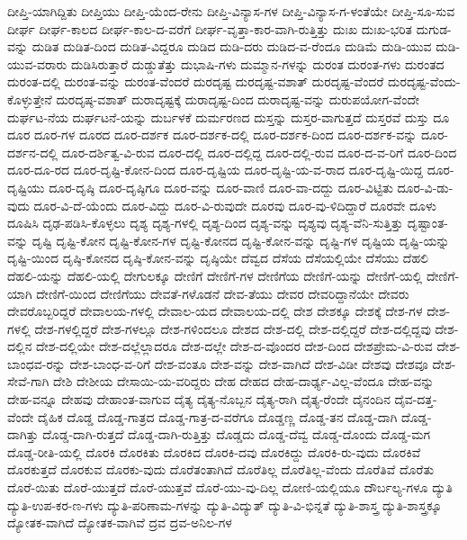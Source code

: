 {ದೀಪ್ತಿ-ಯಾಗಿದ್ದಿತು
ದೀಪ್ತಿಯು
ದೀಪ್ತಿ-ಯೆಂದ-ರೇನು
ದೀಪ್ತಿ-ವಿನ್ಯಾಸ-ಗಳ
ದೀಪ್ತಿ-ವಿನ್ಯಾಸ-ಗ-ಳಂತೆಯೇ
ದೀಪ್ತಿ-ಸೂ-ಸುವ
ದೀರ್ಘ
ದೀರ್ಘ-ಕಾಲದ
ದೀರ್ಘ-ಕಾಲ-ದ-ವರೆಗೆ
ದೀರ್ಘ-ವೃತ್ತಾ-ಕಾರ-ವಾಗಿ-ರುತ್ತಿತ್ತು
ದುಃಖ
ದುಃಖ-ಭರಿತ
ದುಗುಡ-ವನ್ನು
ದುಡಿತ
ದುಡಿತ-ದಿಂದ
ದುಡಿತ-ವಿದ್ದರೂ
ದುಡಿದ
ದುಡಿ-ದರು
ದುಡಿದ-ವ-ರೆಂದೂ
ದುಡಿಮೆ
ದುಡಿ-ಯುವ
ದುಡಿ-ಯುವ-ವರಾರು
ದುಡಿಸಿರುತ್ತಾರೆ
ದುಡ್ಡುತೆತ್ತು
ದುಭಾಷಿ-ಗಳು
ದುಮ್ಮಾನ-ಗಳನ್ನು
ದುರಂತ
ದುರಂತ-ಗಳು
ದುರಂತದ
ದುರಂತ-ದಲ್ಲಿ
ದುರಂತ-ವನ್ನು
ದುರಂತ-ವೆಂದರೆ
ದುರದೃಷ್ಟ
ದುರದೃಷ್ಟ-ವಶಾತ್
ದುರದೃಷ್ಟ-ವೆಂದರೆ
ದುರದೃಷ್ಟ-ವೆಂದು-ಕೊಳ್ಳುತ್ತೇನೆ
ದುರದೃಷ್ಠ-ವಶಾತ್
ದುರಾದೃಷ್ಟಕ್ಕೆ
ದುರಾದೃಷ್ಟ-ದಿಂದ
ದುರಾದೃಷ್ಟ-ವನ್ನು
ದುರುಪಯೋಗ-ವೆಂದೇ
ದುರ್ಘಟ-ನೆಯ
ದುರ್ಘಟನೆ-ಯನ್ನು
ದುರ್ಬಳಕೆ
ದುರ್ಮರಣದ
ದುಸ್ತನ್ನು
ದುಸ್ತರ-ವಾಗುತ್ತದೆ
ದುಸ್ತರವೆ
ದುಸ್ತು
ದೂ
ದೂರ
ದೂರ-ಗಳ
ದೂರದ
ದೂರ-ದರ್ಶಕ
ದೂರ-ದರ್ಶಕ-ದಲ್ಲಿ
ದೂರ-ದರ್ಶಕ-ದಿಂದ
ದೂರ-ದರ್ಶಕ-ವನ್ನು
ದೂರ-ದರ್ಶನ-ದಲ್ಲಿ
ದೂರ-ದರ್ಶಿತ್ವ-ವಿ-ರುವ
ದೂರ-ದಲ್ಲಿ
ದೂರ-ದಲ್ಲಿದ್ದ
ದೂರ-ದಲ್ಲಿ-ರುವ
ದೂರ-ದ-ವ-ರಿಗೆ
ದೂರ-ದಿಂದ
ದೂರ-ದೂ-ರದ
ದೂರ-ದೃಷ್ಟಿ-ಕೋನ-ದಿಂದ
ದೂರ-ದೃಷ್ಟಿಯ
ದೂರ-ದೃಷ್ಟಿ-ಯ-ವ-ರಾದ
ದೂರ-ದೃಷ್ಟಿ-ಯಿದ್ದ
ದೂರ-ದೃಷ್ಟಿಯು
ದೂರ-ದೃಷ್ಠಿ
ದೂರ-ದೃಷ್ಠಿಗೂ
ದೂರ-ವನ್ನು
ದೂರ-ವಾಣಿ
ದೂರ-ವಾ-ದದ್ದು
ದೂರ-ವಿಟ್ಟಿತು
ದೂರ-ವಿ-ಡು-ವುದು
ದೂರ-ವಿ-ದೆ-ಯೆಂದು
ದೂರ-ವಿದ್ದು
ದೂರ-ವಿ-ರುವುದೇ
ದೂರವು
ದೂರ-ವು-ಳಿದಿದ್ದಾರೆ
ದೂರವೇ
ದೂಳು
ದೂಷಿಸಿ
ದೃಢ-ಪಡಿಸಿ-ಕೊಳ್ಳಲು
ದೃಶ್ಯ
ದೃಶ್ಯ-ಗಳಲ್ಲಿ
ದೃಶ್ಯ-ದಿಂದ
ದೃಶ್ಯ-ವನ್ನು
ದೃಶ್ಯವು
ದೃಶ್ಯ-ವೆನಿ-ಸುತ್ತಿತ್ತು
ದೃಷ್ಟಾಂತ-ವನ್ನು
ದೃಷ್ಟಿ
ದೃಷ್ಟಿ-ಕೋನ
ದೃಷ್ಟಿ-ಕೋನ-ಗಳ
ದೃಷ್ಟಿ-ಕೋನದ
ದೃಷ್ಟಿ-ಕೋನ-ವನ್ನು
ದೃಷ್ಟಿ-ಗಳ
ದೃಷ್ಟಿಯ
ದೃಷ್ಟಿ-ಯನ್ನು
ದೃಷ್ಟಿ-ಯಿಂದ
ದೃಷ್ಠಿ-ಕೋನದ
ದೃಷ್ಠಿ-ಕೋನ-ವನ್ನು
ದೃಷ್ಠಿಯೇ
ದೆವ್ವದ
ದೆಸೆಯ
ದೆಸೆಯಲ್ಲಿಯೇ
ದೆಸೆಯು
ದೆಹಲಿ
ದೆಹಲಿ-ಯನ್ನು
ದೆಹಲಿ-ಯಲ್ಲಿ
ದೇಗುಲಕ್ಕೂ
ದೇಣಿಗೆ
ದೇಣಿಗೆ-ಗಳ
ದೇಣಿಗೆಯ
ದೇಣಿಗೆ-ಯನ್ನು
ದೇಣಿಗೆ-ಯಲ್ಲಿ
ದೇಣಿಗೆ-ಯಾಗಿ
ದೇಣಿಗೆ-ಯಿಂದ
ದೇಣಿಗೆಯು
ದೇವತೆ-ಗಳೊಡನೆ
ದೇವ-ತೆಯು
ದೇವರ
ದೇವರಿದ್ದಾನೆಯೇ
ದೇವರು
ದೇವರೊಬ್ಬರಿದ್ದರೆ
ದೇವಾಲಯ-ಗಳಲ್ಲಿ
ದೇವಾಲ-ಯದ
ದೇವಾಲಯ-ದಲ್ಲಿ
ದೇಶ
ದೇಶಕ್ಕೂ
ದೇಶಕ್ಕೆ
ದೇಶ-ಗಳ
ದೇಶ-ಗಳಲ್ಲಿ
ದೇಶ-ಗಳಲ್ಲಿದ್ದರೆ
ದೇಶ-ಗಳಲ್ಲೂ
ದೇಶ-ಗಳಿಂದಲೂ
ದೇಶದ
ದೇಶ-ದಲ್ಲಿ
ದೇಶ-ದಲ್ಲಿದ್ದರೆ
ದೇಶ-ದಲ್ಲಿದ್ದವು
ದೇಶ-ದಲ್ಲಿನ
ದೇಶ-ದಲ್ಲಿಯೇ
ದೇಶ-ದಲ್ಲೆಲ್ಲಾದರೂ
ದೇಶ-ದಲ್ಲೇ
ದೇಶ-ದ-ವೊಂದರ
ದೇಶ-ದಿಂದ
ದೇಶಪ್ರೇಮ-ವಿ-ರುವ
ದೇಶ-ಬಾಂಧವ-ರನ್ನು
ದೇಶ-ಬಾಂಧ-ವ-ರಿಗೆ
ದೇಶ-ವಂತೂ
ದೇಶ-ವನ್ನು
ದೇಶ-ವಾಗಿದೆ
ದೇಶ-ವಿಡೀ
ದೇಶವು
ದೇಶವೂ
ದೇಶ-ಸೇವೆ-ಗಾಗಿ
ದೇಶಿ
ದೇಶೀಯ
ದೇಸಾಯಿ-ಯ-ವರಿದ್ದರು
ದೇಹ
ದೇಹದ
ದೇಹ-ದಾರ್ಢ್ಯ-ವಿಲ್ಲ-ವೆಂದೂ
ದೇಹ-ವನ್ನು
ದೇಹ-ವನ್ನೂ
ದೇಹವು
ದೇಹಾಂತ-ವಾಗುವ
ದೈತ್ಯ
ದೈತ್ಯ-ನೊಬ್ಬನ
ದೈತ್ಯ-ರಾಗಿ
ದೈತ್ಯ-ರೆಂದೇ
ದೈನಂದಿನ
ದೈವ-ದತ್ತ-ವೆಂದೇ
ದೈಹಿಕ
ದೊಡ್ಡ
ದೊಡ್ಡ-ಗಾತ್ರದ
ದೊಡ್ಡ-ಗಾತ್ರ-ದ-ವರೆಗೂ
ದೊಡ್ಡಣ್ಣ
ದೊಡ್ಡ-ತನ
ದೊಡ್ಡ-ದಾಗಿ
ದೊಡ್ಡ-ದಾಗಿತ್ತು
ದೊಡ್ಡ-ದಾಗಿ-ರುತ್ತದೆ
ದೊಡ್ಡ-ದಾಗಿ-ರುತ್ತಿತ್ತು
ದೊಡ್ಡದು
ದೊಡ್ಡ-ದೆವ್ವ
ದೊಡ್ಡ-ದೊಂದು
ದೊಡ್ಡ-ಮಗ
ದೊಡ್ಡ-ರೀತಿ-ಯಲ್ಲಿ
ದೊರಕಿ
ದೊರಕಿತು
ದೊರಕಿದ
ದೊರಕಿ-ದವು
ದೊರಕಿದ್ದು
ದೊರಕಿ-ರು-ವುದು
ದೊರಕಿವೆ
ದೊರಕುತ್ತದೆ
ದೊರಕುವ
ದೊರಕು-ವುದು
ದೊರೆತಂತಾಗಿದೆ
ದೊರೆತಿಲ್ಲ
ದೊರೆತಿಲ್ಲ-ವೆಂದು
ದೊರೆತಿವೆ
ದೊರೆತು
ದೊರೆ-ಯಿತು
ದೊರೆ-ಯುತ್ತದೆ
ದೊರೆ-ಯುತ್ತವೆ
ದೊರೆ-ಯು-ವು-ದಿಲ್ಲ
ದೋಣಿ-ಯಲ್ಲಿಯೂ
ದೌರ್ಬಲ್ಯ-ಗಳೂ
ದ್ಯುತಿ
ದ್ಯುತಿ-ಉಪ-ಕರ-ಣ-ಗಳು
ದ್ಯುತಿ-ಪರಿಣಾಮ-ಗಳನ್ನು
ದ್ಯುತಿ-ವಿದ್ಯುತ್
ದ್ಯುತಿ-ವಿ-ಭಿನ್ನತೆ
ದ್ಯುತಿ-ಶಾಸ್ತ್ರ
ದ್ಯುತಿ-ಶಾಸ್ತ್ರಕ್ಕೂ
ದ್ಯೋತಕ-ವಾಗಿದೆ
ದ್ಯೋತಕ-ವಾಗಿವೆ
ದ್ರವ
ದ್ರವ-ಅನಿಲ-ಗಳ
}
